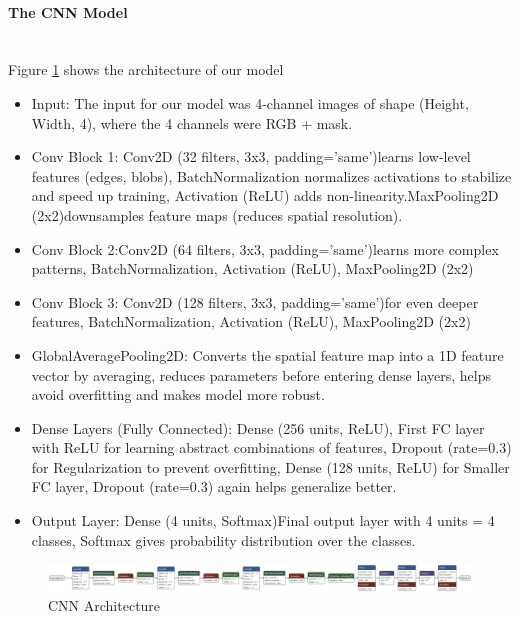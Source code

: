 \documentclass{article}
\begin{document}
\paragraph{The CNN Model}\mbox{}\\
Figure \ref{fig:model_cnnmask1.keras.png} shows the architecture of our model

\begin{itemize}
    \item Input: The input for our model was 4-channel images of shape (Height, Width, 4), where the 4 channels were  RGB + mask.
    \item Conv Block 1: Conv2D (32 filters, 3x3, padding='same')learns low-level features (edges, blobs), BatchNormalization normalizes activations to stabilize and speed up training, Activation (ReLU) adds non-linearity.MaxPooling2D (2x2)downsamples feature maps (reduces spatial resolution).
    \item Conv Block 2:Conv2D (64 filters, 3x3, padding='same')learns more complex patterns, BatchNormalization, Activation (ReLU), MaxPooling2D (2x2)
    \item Conv Block 3:	Conv2D (128 filters, 3x3, padding='same')for even deeper features, BatchNormalization,	Activation (ReLU), MaxPooling2D (2x2)
    \item GlobalAveragePooling2D: Converts the spatial feature map into a 1D feature vector by averaging, reduces parameters before entering dense layers,	helps avoid overfitting and makes model more robust.
    \item Dense Layers (Fully Connected): Dense (256 units, ReLU), First FC layer with ReLU for learning abstract combinations of features, Dropout (rate=0.3) for Regularization to prevent overfitting, Dense (128 units, ReLU) for Smaller FC layer,	Dropout (rate=0.3) again helps generalize better.
    \item Output Layer: Dense (4 units, Softmax)Final output layer with 4 units = 4 classes, Softmax gives probability distribution over the classes.

\end{itemize}


\begin{figure}[h!] %
    \centering
    \includegraphics[width=1.0\linewidth]{model_cnnmask1.keras.png}
    \caption{CNN Architecture}
    \label{fig:model_cnnmask1.keras.png}
\end{figure}
\end{document}
